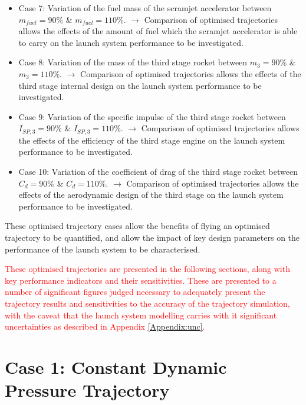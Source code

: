 \begin{itemize}
	\item Case 7: Variation of the fuel mass of the scramjet accelerator between $m_{fuel} = 90\%$ \& $m_{fuel} = 110\%$. 
	\newline$\rightarrow$ Comparison of optimised trajectories allows the effects of the amount of fuel which the scramjet accelerator is able to carry on the launch system performance to be investigated. 
	\item Case 8: Variation of the mass of the third stage rocket between $m_3 = 90\%$ \& $m_3 = 110\%$. 
	\newline$\rightarrow$ Comparison of optimised trajectories allows the effects of the third stage internal design on the launch system performance to be investigated. 
	\item Case 9: Variation of the specific impulse of the third stage rocket between $I_{SP,3} = 90\%$ \& $I_{SP,3} = 110\%$. 
	\newline$\rightarrow$ Comparison of optimised trajectories allows the effects of the efficiency of the third stage engine on the launch system performance to be investigated. 
	\item Case 10: Variation of the coefficient of drag of the third stage rocket between $C_d = 90\%$ \& $C_d = 110\%$.
	\newline$\rightarrow$ Comparison of optimised trajectories allows the effects of the aerodynamic design of the third stage on the launch system performance to be investigated.
\end{itemize}
These optimised trajectory cases allow the benefits of flying an optimised trajectory to be quantified, and allow the impact of key design parameters on the performance of the launch system to be characterised. 

 \textcolor{red}{These optimised trajectories are presented in the following sections, along with key performance indicators and their sensitivities. These are presented to a number of significant figures judged necessary to adequately present the trajectory results and sensitivities to the accuracy of the trajectory simulation, with the caveat that the launch system modelling carries with it significant uncertainties as described in Appendix \ref{Appendix:unc}.}
  

\section{Case 1: Constant Dynamic Pressure Trajectory}\label{sec:constq}

